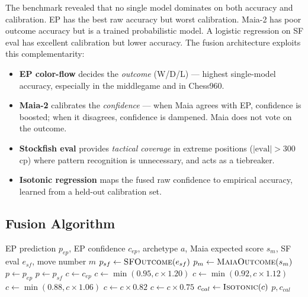 \documentclass[11pt,a4paper]{article}
\begin{document}
The benchmark revealed that no single model dominates on both accuracy
and calibration. EP has the best raw accuracy but worst calibration.
Maia-2 has poor outcome accuracy but is a trained probabilistic model.
A logistic regression on SF eval has excellent calibration but lower
accuracy. The fusion architecture exploits this complementarity:

\begin{itemize}[nosep]
  \item \textbf{EP color-flow} decides the \emph{outcome} (W/D/L) ---
        highest single-model accuracy, especially in the middlegame
        and in Chess960.
  \item \textbf{Maia-2} calibrates the \emph{confidence} --- when Maia
        agrees with EP, confidence is boosted; when it disagrees,
        confidence is dampened. Maia does not vote on the outcome.
  \item \textbf{Stockfish eval} provides \emph{tactical coverage} in
        extreme positions ($|\text{eval}| > 300$cp) where pattern
        recognition is unnecessary, and acts as a tiebreaker.
  \item \textbf{Isotonic regression} maps the fused raw confidence to
        empirical accuracy, learned from a held-out calibration set.
\end{itemize}

\subsection{Fusion Algorithm}

\begin{algorithm}[h]
\caption{EP + Maia + SF Fusion with Isotonic Calibration}
\label{alg:fusion}
\begin{algorithmic}[1]
\Require EP prediction $p_{ep}$, EP confidence $c_{ep}$, archetype $a$,
         Maia expected score $s_m$, SF eval $e_{sf}$, move number $m$
\State $p_{sf} \gets \textsc{SFOutcome}(e_{sf})$
\State $p_m \gets \textsc{MaiaOutcome}(s_m)$
\State {}
\State $p \gets p_{ep}$
  \State $p \gets p_{sf}$ 
\EndIf
\State {}
\State $c \gets c_{ep}$
\State {}
  \State $c \gets \min(0.95, c \times 1.20)$ 
  \State $c \gets \min(0.92, c \times 1.12)$
  \State $c \gets \min(0.88, c \times 1.06)$
  \State $c \gets c \times 0.82$ 
\Else
  \State $c \gets c \times 0.75$ 
\EndIf
\State {}
\State $c_{cal} \gets \textsc{Isotonic}(c)$
\State \Return $p, c_{cal}$
\end{algorithmic}
\end{algorithm}
\end{document}
